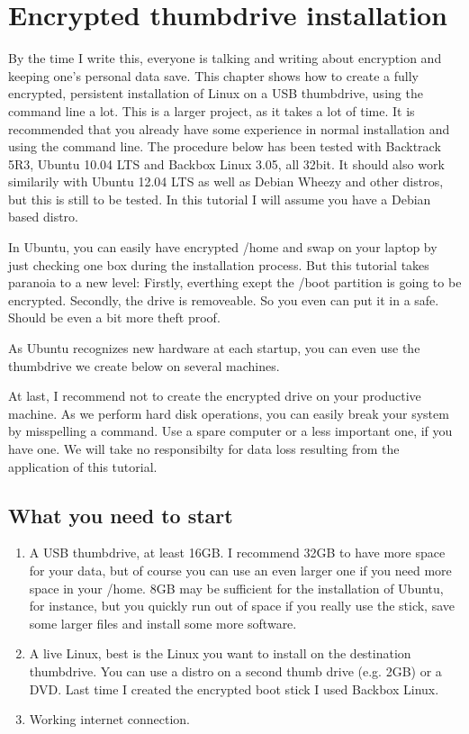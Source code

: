 \documentclass[12pt,a4paper]{article}
\begin{document}
\section{Encrypted thumbdrive installation}
By the time I write this, everyone is talking and writing about encryption and keeping one's personal data save. This chapter shows how to create a fully encrypted, persistent installation of Linux on a USB thumbdrive, using the command line a lot. This is a larger project, as it takes a lot of time. It is recommended that you already have some experience in normal installation and using the command line. The procedure below has been tested with Backtrack 5R3, Ubuntu 10.04 LTS and Backbox Linux 3.05, all 32bit. It should also work similarily with Ubuntu 12.04 LTS as well as Debian Wheezy and other distros, but this is still to be tested. In this tutorial I will assume you have a Debian based distro.

In Ubuntu, you can easily have encrypted /home and swap on your laptop by just checking one box during the installation process. But this tutorial takes paranoia to a new level: Firstly, everthing exept the /boot partition is going to be encrypted. Secondly, the drive is removeable. So you even can put it in a safe. Should be even a bit more theft proof.

As Ubuntu recognizes new hardware at each startup, you can even use the thumbdrive we create below on several machines.

At last, I recommend not to create the encrypted drive on your productive machine. As we perform hard disk operations, you can easily break your system by misspelling a command. Use a spare computer or a less important one, if you have one. We will take no responsibilty for data loss resulting from the application of this tutorial.

\subsection{What you need to start}
\begin{enumerate}
\item A USB thumbdrive, at least 16GB. I recommend 32GB to have more space for your data, but of course you can use an even larger one if you need more space in your /home. 8GB may be sufficient for the installation of Ubuntu, for instance, but you quickly run out of space if you really use the stick, save some larger files and install some more software.
\item A live Linux, best is the Linux you want to install on the destination thumbdrive. You can use a distro on a second thumb drive (e.g. 2GB) or a DVD. Last time I created the encrypted boot stick I used Backbox Linux.
\item Working internet connection.
\end{enumerate}
\end{document}
